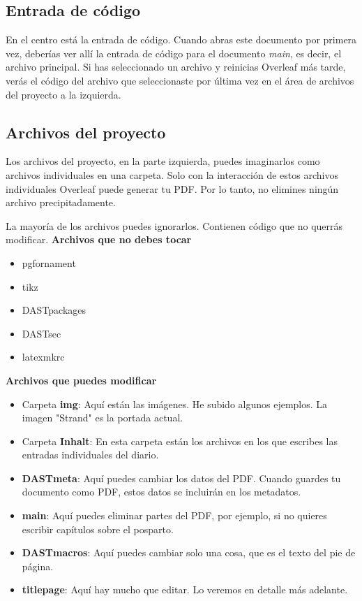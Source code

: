 \subsection{Entrada de código}
En el centro está la entrada de código. Cuando abras este documento por primera vez, deberías ver allí la entrada de código para el documento \emph{main}, es decir, el archivo principal. Si has seleccionado un archivo y reinicias Overleaf más tarde, verás el código del archivo que seleccionaste por última vez en el área de archivos del proyecto a la izquierda.

\subsection{Archivos del proyecto}
Los archivos del proyecto, en la parte izquierda, puedes imaginarlos como archivos individuales en una carpeta. Solo con la interacción de estos archivos individuales Overleaf puede generar tu PDF. Por lo tanto, no elimines ningún archivo precipitadamente.

La mayoría de los archivos puedes ignorarlos. Contienen código que no querrás modificar. \newline
\textbf{Archivos que no debes tocar}
\begin{itemize}
       \item pgfornament
    \item tikz
    \item DASTpackages
    \item DASTsec
    \item latexmkrc
\end{itemize}
\textbf{Archivos que puedes modificar}
\begin{itemize}
    \item Carpeta \textbf{img}: Aquí están las imágenes. He subido algunos ejemplos. La imagen "Strand" es la portada actual.
    \item Carpeta \textbf{Inhalt}: En esta carpeta están los archivos en los que escribes las entradas individuales del diario.
    \item \textbf{DASTmeta}: Aquí puedes cambiar los datos del PDF. Cuando guardes tu documento como PDF, estos datos se incluirán en los metadatos.
    \item \textbf{main}: Aquí puedes eliminar partes del PDF, por ejemplo, si no quieres escribir capítulos sobre el posparto.
    \item \textbf{DASTmacros}: Aquí puedes cambiar solo una cosa, que es el texto del pie de página.
    \item \textbf{titlepage}: Aquí hay mucho que editar. Lo veremos en detalle más adelante.
\end{itemize}

